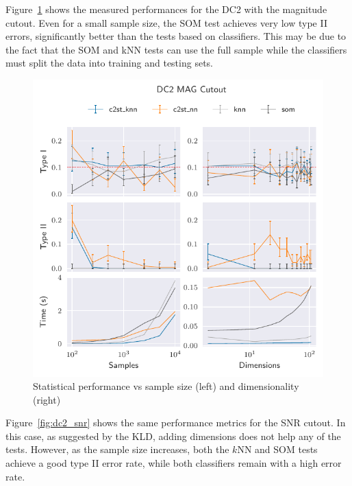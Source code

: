 Figure~\ref{fig:dc2_mag} shows the measured performances for the DC2 with the magnitude
cutout. Even for a small sample size, the \gls{SOM}  test achieves very low type II errors, 
significantly better than the tests based on classifiers.
This may be due to the fact that the \gls{SOM} and kNN
tests can use the full sample while the classifiers must split the data into training and testing sets.


\begin{figure}[htpb]
    \centering
    \includegraphics{images/6_som/dc2_mag}
    \caption{Statistical performance vs sample size (left) and dimensionality (right)}
    \label{fig:dc2_mag}
\end{figure}

Figure~\ref{fig:dc2_snr} shows the same performance metrics for the SNR cutout. In this case,
as suggested by the \gls{KLD}, adding dimensions does not help any of the tests.
However, as the sample size increases, both the $k$NN and \gls{SOM}  tests achieve a good type II error rate,
while both classifiers remain with a high error rate.


